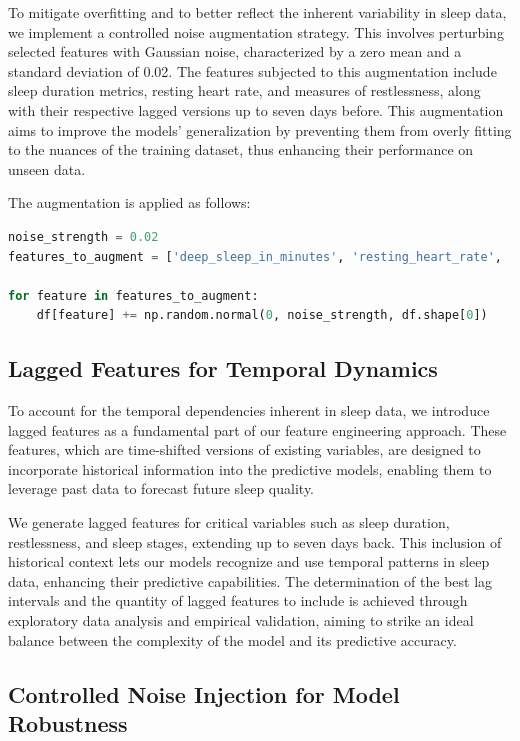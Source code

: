 \documentclass[10pt]{extarticle}
\begin{document}
To mitigate overfitting and to better reflect the inherent variability in sleep data, we implement a controlled noise augmentation strategy. This involves perturbing selected features with Gaussian noise, characterized by a zero mean and a standard deviation of 0.02. The features subjected to this augmentation include sleep duration metrics, resting heart rate, and measures of restlessness, along with their respective lagged versions up to seven days before. This augmentation aims to improve the models' generalization by preventing them from overly fitting to the nuances of the training dataset, thus enhancing their performance on unseen data.

The augmentation is applied as follows:
\begin{lstlisting}[language=Python]
noise_strength = 0.02
features_to_augment = ['deep_sleep_in_minutes', 'resting_heart_rate', 'restlessness'] + [f'deep_sleep_in_minutes_lag{lag}' for lag in range(1, 8)] + [f'restlessness_lag{lag}' for lag in range(1, 8)]

for feature in features_to_augment:
    df[feature] += np.random.normal(0, noise_strength, df.shape[0])
\end{lstlisting}

\subsection{Lagged Features for Temporal Dynamics}

To account for the temporal dependencies inherent in sleep data, we introduce lagged features as a fundamental part of our feature engineering approach. These features, which are time-shifted versions of existing variables, are designed to incorporate historical information into the predictive models, enabling them to leverage past data to forecast future sleep quality.

We generate lagged features for critical variables such as sleep duration, restlessness, and sleep stages, extending up to seven days back. This inclusion of historical context lets our models recognize and use temporal patterns in sleep data, enhancing their predictive capabilities. The determination of the best lag intervals and the quantity of lagged features to include is achieved through exploratory data analysis and empirical validation, aiming to strike an ideal balance between the complexity of the model and its predictive accuracy.

\subsection{Controlled Noise Injection for Model Robustness}
\end{document}
